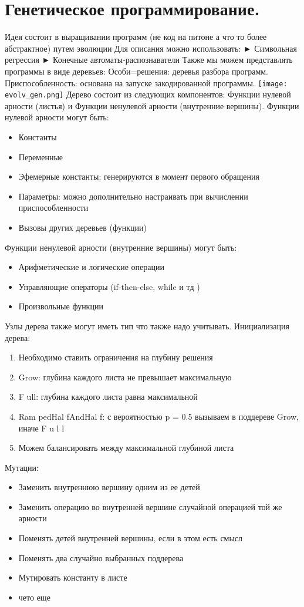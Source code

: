 \section{Генетическое программирование.}
Идея состоит в выращивании программ (не код на питоне а что то более абстрактное) путем эволюции
Для описания можно использовать:
► Символьная регрессия
► Конечные автоматы-распознаватели
Также мы можем представлять программы в виде деревьев:
Особи=решения: деревья разбора программ. Приспособленность: основана на запуске закодированной программы. 
\texttt{[image: evolv\_gen.png]}
Дерево состоит из следующих компонентов: Функции нулевой арности (листья) и Функции ненулевой арности (внутренние вершины).
Функции нулевой арности могут быть:
\begin{itemize}
	\item Константы
	\item Переменные
	\item Эфемерные константы: генерируются в момент первого обращения
	\item Параметры: можно дополнительно настраивать при вычислении приспособленности
	\item Вызовы других деревьев (функции)
\end{itemize}
Функции ненулевой арности (внутренние вершины) могут быть:
\begin{itemize}
	\item Арифметические и логические операции
	\item Управляющие операторы (if-then-else, while и тд )
	\item Произвольные функции
\end{itemize}
Узлы дерева также могут иметь тип что также надо учитывать. 
Инициализация дерева:
\begin{enumerate} 
	\item Необходимо ставить ограничения на глубину решения 
	\item Grow: глубина каждого листа не превышает максимальную
	\item F ull: глубина каждого листа равна максимальной
	\item Ram pedHal fAndHal f: с вероятностью p = 0.5 вызываем в поддереве Grow, иначе F u l l
	\item Можем балансировать между максимальной глубиной листа
\end{enumerate} 
Мутации:
\begin{itemize}
Заменить поддерево случайно сгенерированным деревом
	\item Заменить внутреннюю вершину одним из ее детей
	\item Заменить операцию во внутренней вершине случайной операцией той же арности
	\item Поменять детей внутренней вершины, если в этом есть смысл
	\item Поменять два случайно выбранных поддерева
	\item Мутировать константу в листе
	\item чето еще
\end{itemize}
